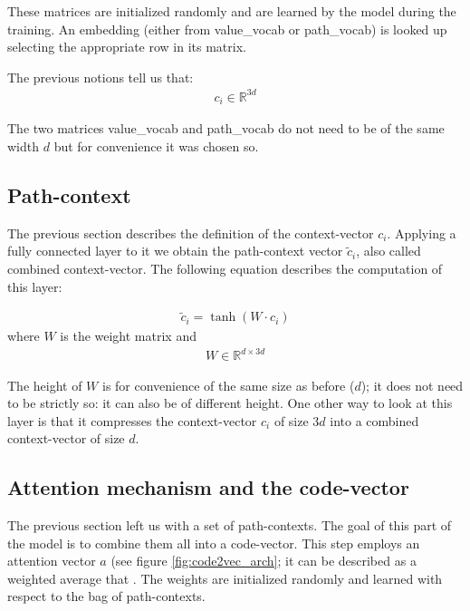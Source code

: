 These matrices are initialized randomly and are learned by the model during the training.
An embedding (either from value\_vocab or path\_vocab) is looked up selecting the appropriate row in its matrix.

The previous notions tell us that:
\begin{align*} 
c_i \in  \mathbb{R}^{3 d}
\end{align*}

The two matrices value\_vocab and path\_vocab do not need to be of the same width $d$ but for convenience it was chosen so.

\subsection{Path-context}
The previous section describes the definition of the context-vector $c_i$. Applying a fully connected layer to it we obtain the path-context vector $\widetilde{c}_i$, also called combined context-vector. The following equation describes the computation of this layer:

\begin{align*} 
\widetilde{c}_i = \tanh( W \cdot c_i )
\end{align*}
where $W$ is the weight matrix and
\begin{align*} 
W \in  \mathbb{R}^{d \times 3 d}
\end{align*}

The height of $W$ is for convenience of the same size as before ($d$); it does not need to be strictly so: it can also be of different height.
One other way to look at this layer is that it compresses the context-vector $c_i$ of size $3d$ into a combined context-vector of size $d$.

\subsection{Attention mechanism and the code-vector} \label{sec:attention_code_vector}
The previous section left us with a set of path-contexts. The goal of this part of the model is to combine them all into a code-vector.
This step employs an attention vector $a$ (see figure \ref{fig:code2vec_arch}; it can be described as a weighted average that . The weights are initialized randomly and learned with respect to the bag of path-contexts. 


